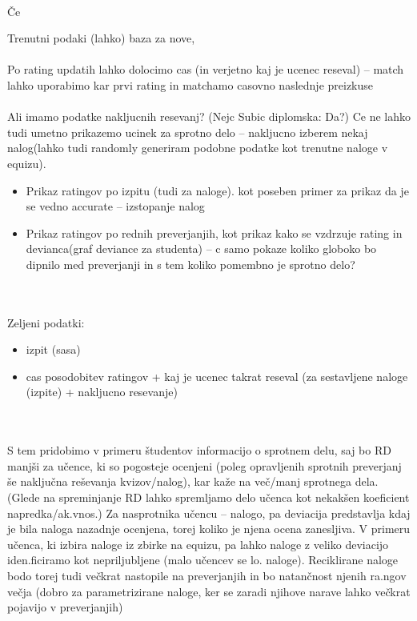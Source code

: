 \documentclass{IEEEtran}
\begin{document}
\hfill
\\

Če 


Trenutni podaki (lahko) baza za nove,
\\
\\
Po rating updatih lahko dolocimo cas (in verjetno kaj je ucenec reseval) -- match lahko uporabimo kar prvi rating in matchamo casovno naslednje preizkuse
\\
\\
Ali imamo podatke nakljucnih resevanj? (Nejc Subic diplomska: Da?)
Ce ne lahko tudi umetno prikazemo ucinek za sprotno delo -- nakljucno izberem nekaj nalog(lahko tudi randomly generiram podobne podatke kot trenutne naloge v equizu).
\\
\begin{itemize}
    \item Prikaz ratingov po izpitu (tudi za naloge). kot poseben primer za prikaz da je se vedno accurate -- izstopanje nalog
    \item Prikaz ratingov po rednih preverjanjih, kot prikaz kako se vzdrzuje rating in devianca(graf deviance za studenta) -- c samo pokaze koliko globoko bo dipnilo med preverjanji in s tem koliko pomembno je sprotno delo?
\end{itemize}
\hfill
\\
\\
Zeljeni podatki:
\begin{itemize}
    \item izpit (sasa)
    \item cas posodobitev ratingov + kaj je ucenec takrat reseval (za sestavljene naloge (izpite) + nakljucno resevanje)
\end{itemize}
\hfill
\\
\\
S tem pridobimo v primeru študentov informacijo o sprotnem delu, saj bo RD manjši za učence, ki so pogosteje ocenjeni (poleg opravljenih sprotnih preverjanj še naključna reševanja kvizov/nalog), kar kaže na več/manj sprotnega dela.
(Glede na spreminjanje RD lahko spremljamo delo učenca kot nekakšen koeficient napredka/ak.vnos.)
Za nasprotnika učencu – nalogo, pa deviacija predstavlja kdaj je bila naloga nazadnje ocenjena, torej koliko je njena ocena zanesljiva. V primeru učenca, ki izbira naloge iz zbirke na equizu, pa lahko naloge z veliko deviacijo iden.ficiramo kot nepriljubljene (malo učencev se lo. naloge).
Reciklirane naloge bodo torej tudi večkrat nastopile na preverjanjih in bo natančnost njenih ra.ngov večja (dobro za parametrizirane naloge, ker se zaradi njihove narave lahko večkrat pojavijo v preverjanjih)
\end{document}
